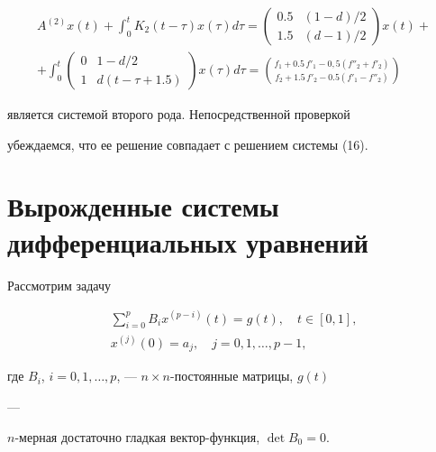 \begin{multline*} 


A^{(2)}x(t)+\int^t_0 K_2(t-\tau)x(\tau)d\tau= 


\begin{pmatrix} 


0.5 & (1-d)/2 \\ 1.5 & (d-1)/2 


\end{pmatrix} 


x(t)+ \\ 


+\int^t_0 


\begin{pmatrix} 


0 & 1-d/2 \\ 1 & d(t-\tau+1.5) 


\end{pmatrix} 


x(\tau)d\tau= 


\binom{f_1+0.5\,f'_1-0,5(f''_2+f'_2)} 


{f_2+1.5\,f'_2-0.5(f'_1-f''_2)} 


\end{multline*} 


является системой второго рода. Непосредственной проверкой 


убеждаемся, что ее решение совпадает с решением системы (16). 


 


\section{Вырожденные системы дифференциальных уравнений} 


 


Рассмотрим задачу 


\begin{gather} 


\sum^p_{i=0}B_i x^{(p-i)}(t)=g(t),\quad t\in[0,1], \\ 


x^{(j)}(0)=a_j,\quad j=0,1,\dotsc,p-1, 


\end{gather} 


где $B_i$, $i=0,1,\dotsc,p$, --- $n\times n$-постоянные матрицы, $g(t)$ 


--- 


$n$-мерная достаточно гладкая вектор-функция, $\det B_0=0$. 


